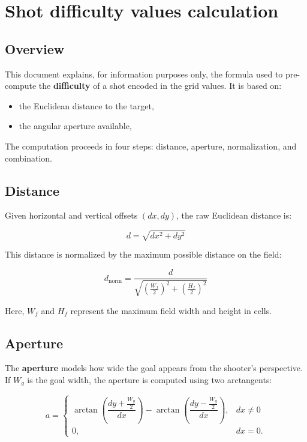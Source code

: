 \documentclass[12pt]{article}
\begin{document}
\endgroup

\clearpage
\section{Shot difficulty values calculation}

\subsection{Overview}

This document explains, for information purposes only, the formula used to pre-compute the \textbf{difficulty} of a shot encoded in the grid values. It is based on:

\begin{itemize}
    \item the Euclidean distance to the target,
    \item the angular aperture available,
\end{itemize}

The computation proceeds in four steps: distance, aperture, normalization, and combination.

\subsection{Distance}

Given horizontal and vertical offsets $(dx, dy)$, the raw Euclidean distance is:

\[
d = \sqrt{dx^{2} + dy^{2}}
\]

This distance is normalized by the maximum possible distance on the field:

\[
d_{\text{norm}} =
\frac{
    d
}{
    \sqrt{\left(\frac{W_f}{2}\right)^{2} + \left(\frac{H_f}{2}\right)^{2}}
}
\]

Here, $W_f$ and $H_f$ represent the maximum field width and height in cells.

\subsection{Aperture}

The \textbf{aperture} models how wide the goal appears from the shooter's perspective.  
If $W_g$ is the goal width, the aperture is computed using two arctangents:

\[
a =
\begin{cases}
\arctan\!\left(\dfrac{dy + \frac{W_g}{2}}{dx}\right)
-
\arctan\!\left(\dfrac{dy - \frac{W_g}{2}}{dx}\right),
& dx \neq 0 \\[10pt]
0, & dx = 0.
\end{cases}
\]
\end{document}
